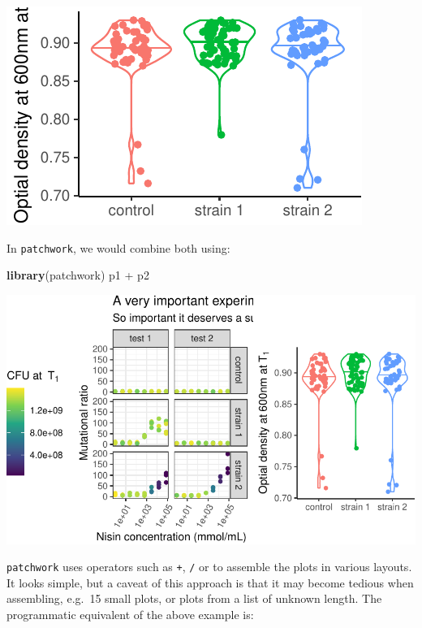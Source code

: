\documentclass[]{book}
\newenvironment{Shaded}{}{}
\newcommand{\KeywordTok}[1]{\textcolor[rgb]{0.00,0.44,0.13}{\textbf{#1}}}
\newcommand{\NormalTok}[1]{#1}
\newcommand{\OperatorTok}[1]{\textcolor[rgb]{0.40,0.40,0.40}{#1}}
\newcommand{\StringTok}[1]{\textcolor[rgb]{0.25,0.44,0.63}{#1}}
\begin{document}
\begin{center}\includegraphics[width=\textwidth]{TRES-Tidy-Tutorial_files/figure-latex/unnamed-chunk-150-1} \end{center}

In \texttt{patchwork}, we would combine both using:

\begin{Shaded}
\begin{Highlighting}[]
\KeywordTok{library}\NormalTok{(patchwork)}
\NormalTok{p1 }\OperatorTok{+}\StringTok{ }\NormalTok{p2}
\end{Highlighting}
\end{Shaded}

\begin{center}\includegraphics[width=\textwidth]{TRES-Tidy-Tutorial_files/figure-latex/unnamed-chunk-151-1} \end{center}

\texttt{patchwork} uses operators such as \texttt{+}, \texttt{/} or \texttt{\textbar{}} to assemble the plots in various layouts. It looks simple, but a caveat of this approach is that it may become tedious when assembling, e.g.~15 small plots, or plots from a list of unknown length. The programmatic equivalent of the above example is:
\end{document}
